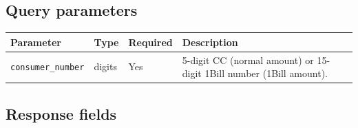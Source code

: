 \documentclass[11pt]{article}
\begin{document}
\subsection{Query parameters}
\begin{center}
\begin{tabularx}{\textwidth}{@{}l l l L@{}}
\toprule
\textbf{Parameter} & \textbf{Type} & \textbf{Required} & \textbf{Description} \\
\midrule
\texttt{consumer\_number} & digits & Yes & 5-digit CC (normal amount) or 15-digit 1Bill number (1Bill amount). \\
\bottomrule
\end{tabularx}
\end{center}

\subsection{Response fields}
\end{document}
